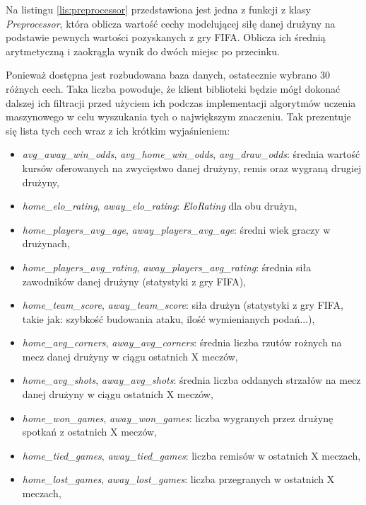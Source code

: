         Na listingu \ref{lis:preprocessor} przedstawiona jest jedna z funkcji z klasy \emph{Preprocessor}, która oblicza wartość cechy modelującej siłę danej drużyny na podstawie pewnych wartości pozyskanych z gry FIFA. Oblicza ich średnią arytmetyczną i zaokrągla wynik do dwóch miejsc po przecinku.
        
        Ponieważ dostępna jest rozbudowana baza danych, ostatecznie wybrano 30 różnych cech. Taka liczba powoduje, że klient biblioteki będzie mógł dokonać dalszej ich filtracji przed użyciem ich podczas implementacji algorytmów uczenia maszynowego w celu wyszukania tych o największym znaczeniu. Tak prezentuje się lista tych cech wraz z ich krótkim wyjaśnieniem:
        
        \begin{itemize}
            \item \emph{avg\_away\_win\_odds}, \emph{avg\_home\_win\_odds}, \emph{avg\_draw\_odds}: średnia wartość kursów oferowanych na zwycięstwo danej drużyny, remis oraz wygraną drugiej drużyny,
            \item \emph{home\_elo\_rating}, \emph{away\_elo\_rating}: \emph{EloRating} dla obu drużyn,
            \item \emph{home\_players\_avg\_age}, \emph{away\_players\_avg\_age}: średni wiek graczy w drużynach, 
            \item \emph{home\_players\_avg\_rating}, \emph{away\_players\_avg\_rating}: średnia siła zawodników danej drużyny (statystyki z gry FIFA), 
            \item \emph{home\_team\_score}, \emph{away\_team\_score}: siła drużyn (statystyki z gry FIFA, takie jak: szybkość budowania ataku, ilość wymienianych podań...), 
            \item \emph{home\_avg\_corners}, \emph{away\_avg\_corners}: średnia liczba rzutów rożnych na mecz danej drużyny w ciągu ostatnich X meczów, 
            \item \emph{home\_avg\_shots}, \emph{away\_avg\_shots}: średnia liczba oddanych strzałów na mecz danej drużyny w ciągu ostatnich X meczów, 
            \item \emph{home\_won\_games}, \emph{away\_won\_games}: liczba wygranych przez drużynę spotkań z ostatnich X meczów, 
            \item \emph{home\_tied\_games}, \emph{away\_tied\_games}: liczba remisów w ostatnich X meczach, 
            \item \emph{home\_lost\_games}, \emph{away\_lost\_games}: liczba przegranych w ostatnich X meczach, 

\end{itemize}
